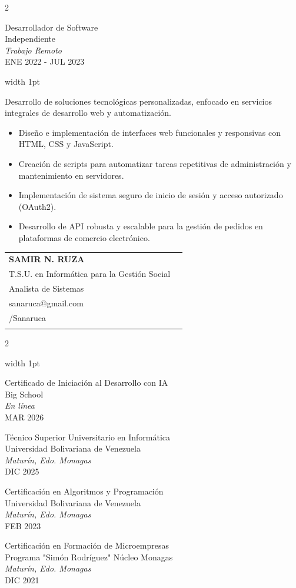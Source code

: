 \documentclass[9pt, a4paper]{article}
\makeatletter
\newcommand{\CVSection}[1]{
    \vspace{0.1cm}
    \noindent{\large\bfseries\ttfamily\color{CVPrimary} \raggedright \MakeUppercase{#1}\par}
    \vspace{0.5cm}
}
\newcommand{\CVExpMeta}[4]{
    {\noindent
    {\PlexMedium\color{CVPrimary} #1} \\
    {\PlexSans #2} \\
    {\PlexLight\itshape #3} \\
    {\PlexExtraLight #4}}
    \vspace{0.85cm}
}
\newcommand{\CVExpBody}[1]{
    \noindent
    \textcolor{CVLine}{\vrule width 1pt} \hspace{1cm}
    \begin{minipage}[t]{0.92\linewidth}
        \raggedright {\DMSansLight #1}
    \end{minipage}
    \vspace{0.8cm}
}
\newcommand{\CVContact}[2]{
    {\DMSansMedium\makebox[1.1cm][l]{#1}} {\DMSansLight #2} \\[0.04cm]
}
\newcommand{\CVEdItem}[4]{
    \noindent
    {\PlexMedium #1} \\
    {\PlexSans #2} \\
    {\PlexLight\itshape #3} \\
    {\PlexExtraLight #4}
    \vspace{0.85cm}
}
\newcommand{\CVHeader}{
    {\topskip=0pt
    \vspace*{-1.3cm}
    \arrayrulecolor{CVLine}
    \noindent
    \begin{tabular}{@{}p{\dimexpr0.74\linewidth-0.6cm\relax}@{\hspace{0.4cm}}|@{\hspace{0.8cm}}p{\dimexpr0.26\linewidth-0.2cm\relax}@{}}
    \rule{0pt}{2.3cm}
    {\Huge\ttfamily\hspace*{-2.9pt}\addfontfeature{LetterSpace=30}\textbf{\MakeUppercase{Samir N. Ruza}}} \\[-5pt]
    {\large\color{CVPrimary}\PlexMonoMedium T.S.U. en Informática para la Gestión Social} \\[-5pt]
    {\large\color{CVText}\ttfamily Analista de Sistemas}
    &
    \footnotesize
    \begin{minipage}[t]{\linewidth}
    \vspace*{-1.8cm}
    \raggedright
    \CVContact{tlf.}{+58 424 9088 629}
    \CVContact{ce.}{sanaruca@gmail.com}
    \CVContact{github}{/Sanaruca}
    \end{minipage}
    \end{tabular}}
}
\makeatother
\begin{document}
\begin{paracol}{2}
\CVExpMeta{Desarrollador de Software}
{Independiente}
{Trabajo Remoto}
{ENE 2022 - JUL 2023}
\switchcolumn
\CVExpBody{
Desarrollo de soluciones tecnológicas personalizadas, enfocado en servicios integrales de desarrollo web y automatización.
\begin{itemize}[label=\textcolor{CVBullet}{–}, leftmargin=0.5cm, topsep=0.4cm, itemsep=0.15cm]
    \item Diseño e implementación de interfaces web funcionales y responsivas con HTML, CSS y JavaScript.
    \item Creación de scripts para automatizar tareas repetitivas de administración y mantenimiento en servidores.
    \item Implementación de sistema seguro de inicio de sesión y acceso autorizado (OAuth2).
    \item Desarrollo de API robusta y escalable para la gestión de pedidos en plataformas de comercio electrónico.
\end{itemize}
}

\end{paracol}

\newpage
\CVHeader
\vspace{1cm}
\begin{paracol}{2}

\CVSection{Educación}
\switchcolumn
\vspace{0.1cm}

\noindent
\textcolor{CVLine}{\vrule width 1pt} \hspace{1cm}
\begin{minipage}[t]{\dimexpr\linewidth-0.4cm-1.5pt}
    \CVEdItem{Certificado de Iniciación al Desarrollo con IA}
    {Big School}
    {En línea}
    {MAR 2026}

    \CVEdItem{Técnico Superior Universitario en Informática}
    {Universidad Bolivariana de Venezuela}
    {Maturín, Edo. Monagas}
    {DIC 2025}

    \CVEdItem{Certificación en Algoritmos y Programación}
    {Universidad Bolivariana de Venezuela}
    {Maturín, Edo. Monagas}
    {FEB 2023}

    \CVEdItem{Certificación en Formación de Microempresas}
    {Programa "Simón Rodríguez" Núcleo Monagas}
    {Maturín, Edo. Monagas}
    {DIC 2021}
\end{minipage}

\end{paracol}
\end{document}
